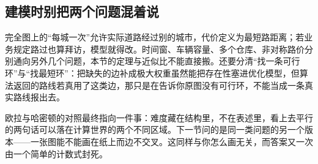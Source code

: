 \subsection{建模时别把两个问题混着说}

完全图上的``每城一次''允许实际道路经过别的城市，代价定义为最短路距离；若业务规定路过也算拜访，模型就得改。时间窗、车辆容量、多个仓库、非对称路价分别通向另外几个问题，本节的定理与近似比不能直接搬。还要分清``找一条可行环''与``找最短环''：把缺失的边补成极大权重虽然能把存在性塞进优化模型，但算法返回的路线若真用了这类边，那只是在告诉你原图没有可行环，不能当成一条真实路线报出去。

欧拉与哈密顿的对照最终指向一件事：难度藏在结构里，不在表述里，看上去平行的两句话可以落在计算世界的两个不同区域。下一节问的是同一类问题的另一个版本——一张图能不能画在纸上而边不交叉。这同样与你怎么画无关，而答案又一次由一个简单的计数式封死。
